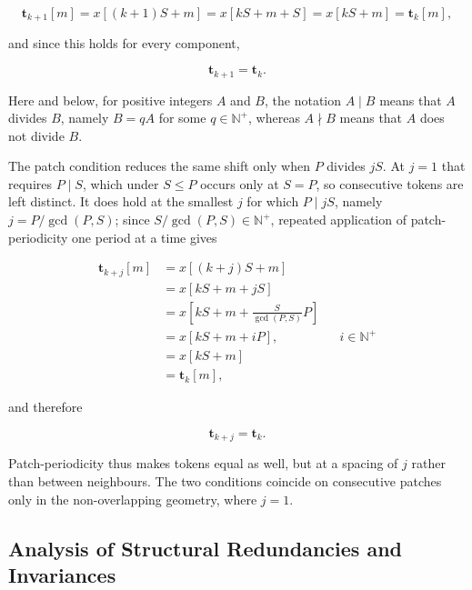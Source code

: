 \begin{equation}
\label{eq:collapse_S}
\mathbf{t}_{k+1}[m]
=
x[(k+1)S+m]
=
x[kS+m+S]
=
x[kS+m]
=
\mathbf{t}_k[m],
\end{equation}

and since this holds for every component,

\begin{equation}
\label{eq:token_collapse}
\mathbf{t}_{k+1}
=
\mathbf{t}_k.
\end{equation}

Here and below, for positive integers $A$ and $B$, the notation $A\mid B$ means that $A$ divides $B$, namely $B=qA$ for some $q\in\mathbb{N}^{+}$, whereas $A\nmid B$ means that $A$ does not divide $B$.

The patch condition reduces the same shift only when $P$ divides $jS$. At $j=1$ that requires $P \mid S$, which under $S\le P$ occurs only at $S=P$, so consecutive tokens are left distinct. It does hold at the smallest $j$ for which $P \mid jS$, namely $j = P/\gcd(P,S)$; since $S/\gcd(P,S)\in\mathbb{N}^{+}$, repeated application of patch-periodicity one period at a time gives

\begin{equation}
\label{eq:collapse_P}
\begin{aligned}
\mathbf{t}_{k+j}[m]
&=
x[(k+j)S+m]
\\
&=
x[kS+m+jS]
\\
&=
x\!\left[kS+m+\frac{S}{\gcd(P,S)}P\right]
\\
&=
x[kS+m+iP],
&& i\in\mathbb{N}^{+}
\\
&=
x[kS+m]
\\
&=
\mathbf{t}_k[m],
\end{aligned}
\end{equation}

and therefore

\begin{equation}
\label{eq:token_period_P}
\mathbf{t}_{k+j}
=
\mathbf{t}_k.
\end{equation}

Patch-periodicity thus makes tokens equal as well, but at a spacing of $j$ rather than between neighbours. The two conditions coincide on consecutive patches only in the non-overlapping geometry, where $j=1$.

\subsection{Analysis of Structural Redundancies and Invariances}

